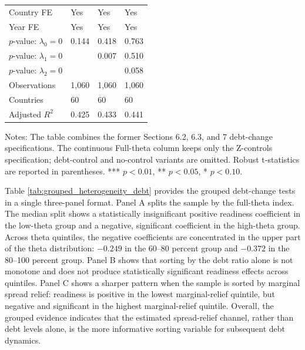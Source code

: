 \documentclass[11pt]{article}
\theoremstyle{definition}
\begin{document}
\begin{table}[H]
\begin{threeparttable}
\begin{tabularx}{\textwidth}{lYYY}
Country FE & Yes & Yes & Yes \\
Year FE & Yes & Yes & Yes \\
$p$-value: $\lambda_0=0$ & 0.144 & 0.418 & 0.763 \\
$p$-value: $\lambda_1=0$ &  & 0.007 & 0.510 \\
$p$-value: $\lambda_2=0$ &  &  & 0.058 \\
Observations & 1,060 & 1,060 & 1,060 \\
Countries & 60 & 60 & 60 \\
Adjusted $R^2$ & 0.425 & 0.433 & 0.441 \\
\bottomrule
\end{tabularx}
\begin{tablenotes}[flushleft]\footnotesize
\item Notes: The table combines the former Sections 6.2, 6.3, and 7 debt-change specifications. The continuous Full-theta column keeps only the Z-controls specification; debt-control and no-control variants are omitted. Robust t-statistics are reported in parentheses. *** $p<0.01$, ** $p<0.05$, * $p<0.10$.
\end{tablenotes}
\end{threeparttable}
\end{table}

Table \ref{tab:grouped_heterogeneity_debt} provides the grouped debt-change tests in a single three-panel format. Panel A splits the sample by the full-theta index. The median split shows a statistically insignificant positive readiness coefficient in the low-theta group and a negative, significant coefficient in the high-theta group. Across theta quintiles, the negative coefficients are concentrated in the upper part of the theta distribution: $-0.249$ in the 60--80 percent group and $-0.372$ in the 80--100 percent group. Panel B shows that sorting by the debt ratio alone is not monotone and does not produce statistically significant readiness effects across quintiles. Panel C shows a sharper pattern when the sample is sorted by marginal spread relief: readiness is positive in the lowest marginal-relief quintile, but negative and significant in the highest marginal-relief quintile. Overall, the grouped evidence indicates that the estimated spread-relief channel, rather than debt levels alone, is the more informative sorting variable for subsequent debt dynamics.
\end{document}
